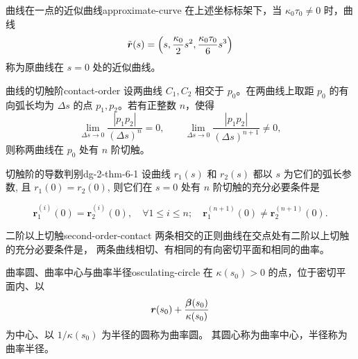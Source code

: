 \begin{definition}{曲线在一点的近似曲线}{approximate-curve}
在上述坐标标架下，当 $\kappa_0\tau_0\neq0$ 时，曲线
\[
\tilde{\boldsymbol{r}}(s)=\left(s,\frac{\kappa_0}{2}s^2,
\frac{\kappa_0\tau_0}{6}s^3\right)
\]
称为原曲线在 $s=0$ 处的近似曲线。
\end{definition}

\begin{definition}{曲线的切触阶}{contact-order}
设两曲线 $C_1,C_2$ 相交于 $p_0$。在两曲线上取距 $p_0$ 的有向弧长均为
$\Delta s$ 的点 $p_1,p_2$。若有正整数 $n$，使得
\[
\lim_{\Delta s\to0}\frac{|p_1p_2|}{(\Delta s)^n}=0,\qquad
\lim_{\Delta s\to0}\frac{|p_1p_2|}{(\Delta s)^{n+1}}\neq0,
\]
则称两曲线在 $p_0$ 处有 $n$ 阶切触。
\end{definition}

\begin{theorem}{切触阶的导数判别}{dg-2-thm-6-1}
设曲线 \(r_1(s)\) 和 \(r_2(s)\) 都以 \(s\) 为它们的弧长参数, 且 \(r_1(0) = r_2(0)\), 则它们在 \(s = 0\) 处有 \(n\) 阶切触的充分必要条件是\par

\begin{equation*}
\boldsymbol {r} _ {1} ^ {(i)} (0) = \boldsymbol {r} _ {2} ^ {(i)} (0), \quad \forall 1 \leqslant i \leqslant n; \quad \boldsymbol {r} _ {1} ^ {(n + 1)} (0) \neq \boldsymbol {r} _ {2} ^ {(n + 1)} (0).
\end{equation*}
\end{theorem}

\begin{corollary}{二阶以上切触}{second-order-contact}
两条相交的正则曲线在交点处有二阶以上切触的充分必要条件是，
两条曲线相切、有相同的有向密切平面和相同的曲率。
\end{corollary}

\begin{definition}{曲率圆、曲率中心与曲率半径}{osculating-circle}
在 $\kappa(s_0)>0$ 的点，位于密切平面内、以
\[
\boldsymbol{r}(s_0)+\frac{\boldsymbol{\beta}(s_0)}{\kappa(s_0)}
\]
为中心、以 $1/\kappa(s_0)$ 为半径的圆称为曲率圆。
其圆心称为曲率中心，半径称为曲率半径。
\end{definition}

